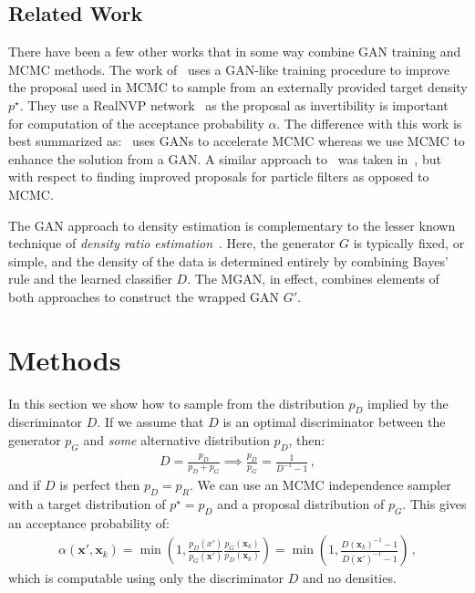 \documentclass{article}
\renewcommand{\vec}[1]{{\boldsymbol{\mathbf{#1}}}} %
\newcommand{\target}{{p^\star}}
\newcommand{\PG}{{p_G}}
\newcommand{\PD}{{p_D}}
\newcommand{\PR}{{p_R}}
\newcommand{\accept}{\alpha}
\begin{document}
\subsection{Related Work}

There have been a few other works that in some way combine GAN training and MCMC methods.
The work of~\citet{Song2017} uses a GAN-like training procedure to improve the proposal used in MCMC to sample from an externally provided target density $\target$.
They use a RealNVP network~\citep{Dinh2016} as the proposal as invertibility is important for computation of the acceptance probability $\accept$.
The difference with this work is best summarized as:~\citet{Song2017} uses GANs to accelerate MCMC whereas we use MCMC to enhance the solution from a GAN\@.
A similar approach to~\citet{Song2017} was taken in~\citet{Kempinska2017}, but with respect to finding improved proposals for particle filters as opposed to MCMC\@.

The GAN approach to density estimation is complementary to the lesser known technique of \emph{density ratio estimation}~\citep{Sugiyama2012}.
Here, the generator $G$ is typically fixed, or simple, and the density of the data is determined entirely by combining Bayes' rule and the learned classifier $D$.
The MGAN, in effect, combines elements of both approaches to construct the wrapped GAN $G'$.

\section{Methods}

In this section we show how to sample from the distribution $\PD$ implied by the discriminator $D$.
If we assume that $D$ is an optimal discriminator between the generator $\PG$ and \emph{some} alternative distribution $\PD$, then:
\begin{align}
  D = \frac{\PD}{\PD + \PG} \implies \frac{\PD}{\PG} = \frac{1}{D^{-1}-1}\,, \label{eq:PD def}
\end{align}
and if $D$ is perfect then $\PD = \PR$.
We can use an MCMC independence sampler with a target distribution of $\target=\PD$ and a proposal distribution of $\PG$.
This gives an acceptance probability of:
\begin{align}
  \accept(\vec x', \vec x_k)
    = \min\left(1, \frac{\PD(x')}{\PG(\vec x')} \frac{\PG(\vec x_k)}{\PD(\vec x_k)}\right)
    = \min\left(1, \frac{D(\vec x_k)^{-1} - 1}{D(\vec x')^{-1} - 1}\right)\,, \label{eq:alpha from D}
\end{align}
which is computable using only the discriminator $D$ and no densities.
\end{document}
